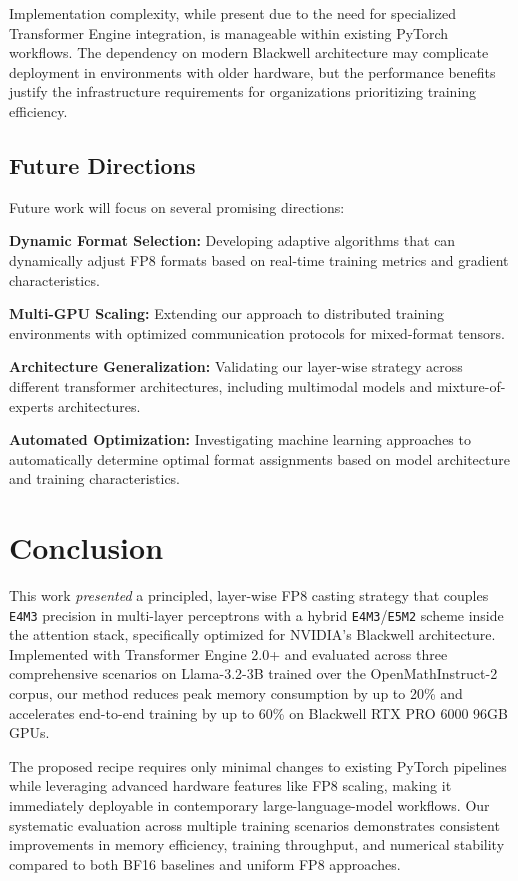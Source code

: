 \documentclass[conference]{IEEEtran}
\begin{document}
Implementation complexity, while present due to the need for specialized Transformer Engine integration, is manageable within existing PyTorch workflows. The dependency on modern Blackwell architecture may complicate deployment in environments with older hardware, but the performance benefits justify the infrastructure requirements for organizations prioritizing training efficiency.

\subsection{Future Directions}

Future work will focus on several promising directions:

\textbf{Dynamic Format Selection:} Developing adaptive algorithms that can dynamically adjust FP8 formats based on real-time training metrics and gradient characteristics.

\textbf{Multi-GPU Scaling:} Extending our approach to distributed training environments with optimized communication protocols for mixed-format tensors.

\textbf{Architecture Generalization:} Validating our layer-wise strategy across different transformer architectures, including multimodal models and mixture-of-experts architectures.

\textbf{Automated Optimization:} Investigating machine learning approaches to automatically determine optimal format assignments based on model architecture and training characteristics.

\section{Conclusion}
\label{sec:conclusion}

This work \emph{presented} a principled, layer-wise FP8 casting strategy that couples \texttt{E4M3} precision in multi-layer perceptrons with a hybrid \texttt{E4M3}/\texttt{E5M2} scheme inside the attention stack, specifically optimized for NVIDIA's Blackwell architecture. Implemented with Transformer Engine 2.0+ and evaluated across three comprehensive scenarios on Llama-3.2-3B trained over the OpenMathInstruct-2 corpus, our method reduces peak memory consumption by up to 20\% and accelerates end-to-end training by up to 60\% on Blackwell RTX PRO 6000 96GB GPUs.

The proposed recipe requires only minimal changes to existing PyTorch pipelines while leveraging advanced hardware features like FP8 scaling, making it immediately deployable in contemporary large-language-model workflows. Our systematic evaluation across multiple training scenarios demonstrates consistent improvements in memory efficiency, training throughput, and numerical stability compared to both BF16 baselines and uniform FP8 approaches.
\end{document}
